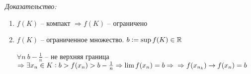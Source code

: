 \documentclass[12pt]{article}
\begin{document}
\textit{Доказательство:}

\begin{enumerate}
    \item $f(K)$ -- компакт $\Rightarrow f(K)$ -- ограничено
    \item $f(K)$ -- ограниченное множество. $b := \sup f(K) \in \mathbb R$
    
    $\forall n\ b - \frac{1}{n}$ -- не верхняя граница $\Rightarrow \exists x_n \in K : b > f(x_n) > b - \frac{1}{n} \Rightarrow \lim f(x_n) = b \Rightarrow \\ \Rightarrow f(x_{n_k}) \to f(x_n) = b$
\end{enumerate}
\end{document}
